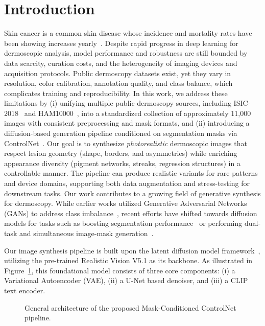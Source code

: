 \documentclass[a4paper,11pt]{article}
\begin{document}
\section*{Introduction}
Skin cancer is a common skin disease whose incidence and mortality rates have been showing increases yearly~\cite{Wang_M}. Despite rapid progress in deep learning for dermoscopic analysis, model performance and robustness are still bounded by data scarcity, curation costs, and the heterogeneity of imaging devices and acquisition protocols. Public dermoscopy datasets exist, yet they vary in resolution, color calibration, annotation quality, and class balance, which complicates training and reproducibility. In this work, we address these limitations by (i) unifying multiple public dermoscopy sources, including ISIC-2018~\cite{Codella2019ISIC2018} and HAM10000~\cite{Tschandl2018HAM10000}, into a standardized collection of approximately 11,000 images with consistent preprocessing and mask formats, and (ii) introducing a diffusion-based generation pipeline conditioned on segmentation masks via ControlNet~\cite{zhang2023adding}. Our goal is to synthesize \emph{photorealistic} dermoscopic images that respect lesion geometry (shape, borders, and asymmetries) while enriching appearance diversity (pigment networks, streaks, regression structures) in a controllable manner. The pipeline can produce realistic variants for rare patterns and device domains, supporting both data augmentation and stress-testing for downstream tasks. Our work contributes to a growing field of generative synthesis for dermoscopy. While earlier works utilized Generative Adversarial Networks (GANs) to address class imbalance~\cite{qasim2021redganattackingclassimbalance}, recent efforts have shifted towards diffusion models for tasks such as boosting segmentation performance~\cite{du2023boostingdermatoscopiclesionsegmentation} or performing dual-task and simultaneous image-mask generation~\cite{SheJun_DiDGen_MICCAI2025, xu2025skindualgenpromptdrivendiffusionsimultaneous}.

Our image synthesis pipeline is built upon the latent diffusion model framework~\cite{Rombach2022LDM}, utilizing the pre-trained Realistic Vision V5.1 as its backbone. As illustrated in Figure~\ref{fig:architecture}, this foundational model consists of three core components: (i) a Variational Autoencoder (VAE), (ii) a U-Net based denoiser, and (iii) a CLIP text encoder.

\begin{figure}[H]
    \centering
    \resizebox{\linewidth}{!}{%
        \sffamily
    }
    \caption{General architecture of the proposed Mask-Conditioned ControlNet pipeline.}
    \label{fig:architecture}
\end{figure}
\end{document}
